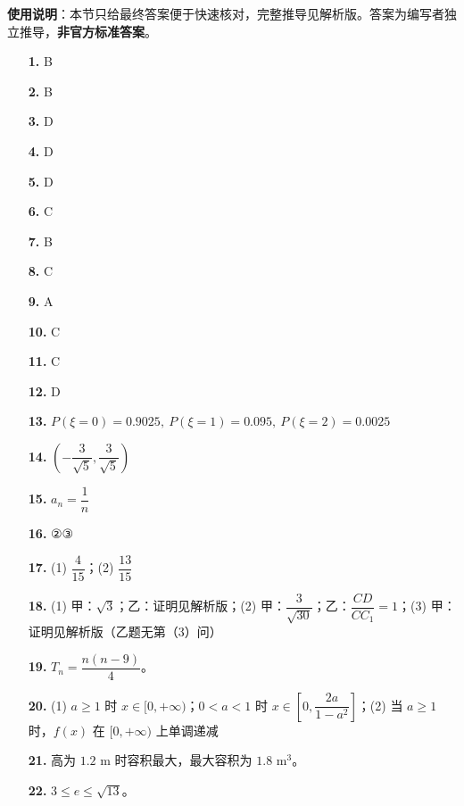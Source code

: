 
\begin{gknotice}
\textbf{使用说明}：本节只给最终答案便于快速核对，完整推导见解析版。答案为编写者独立推导，\textbf{非官方标准答案}。
\end{gknotice}

\begin{itemize}[leftmargin=2.6em]
  \item[\textbf{1.}] B
  \item[\textbf{2.}] B
  \item[\textbf{3.}] D
  \item[\textbf{4.}] D
  \item[\textbf{5.}] D
  \item[\textbf{6.}] C
  \item[\textbf{7.}] B
  \item[\textbf{8.}] C
  \item[\textbf{9.}] A
  \item[\textbf{10.}] C
  \item[\textbf{11.}] C
  \item[\textbf{12.}] D
  \item[\textbf{13.}] $P(\xi=0)=0.9025,\ P(\xi=1)=0.095,\ P(\xi=2)=0.0025$
  \item[\textbf{14.}] $\left(-\dfrac3{\sqrt5},\dfrac3{\sqrt5}\right)$
  \item[\textbf{15.}] $a_n=\dfrac1n$
  \item[\textbf{16.}] ②③
  \item[\textbf{17.}] (1) $\dfrac4{15}$；(2) $\dfrac{13}{15}$
  \item[\textbf{18.}] (1) 甲：$\sqrt3$；乙：证明见解析版；(2) 甲：$\dfrac3{\sqrt{30}}$；乙：$\dfrac{CD}{CC_1}=1$；(3) 甲：证明见解析版（乙题无第（3）问）
  \item[\textbf{19.}] $T_n=\dfrac{n(n-9)}4$。
  \item[\textbf{20.}] (1) $a\ge1$ 时 $x\in[0,+\infty)$；$0<a<1$ 时 $x\in\left[0,\dfrac{2a}{1-a^2}\right]$；(2) 当 $a\ge1$ 时，$f(x)$ 在 $[0,+\infty)$ 上单调递减
  \item[\textbf{21.}] 高为 $1.2$ m 时容积最大，最大容积为 $1.8$ m$^3$。
  \item[\textbf{22.}] $3\le e\le\sqrt{13}$。
\end{itemize}
